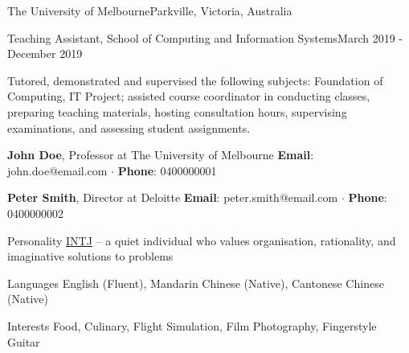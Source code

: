 \documentclass{cv}
\begin{document}
\begin{cvlist}
\begin{cvheading}{The University of Melbourne}{Parkville, Victoria, Australia}
\begin{cvsubheading}{Teaching Assistant, School of Computing and Information Systems}{March 2019 - December 2019}
    \item Tutored, demonstrated and supervised the following subjects: Foundation of Computing, IT Project; assisted course coordinator in conducting classes, preparing teaching materials, hosting consultation hours, supervising examinations, and assessing student assignments.
\end{cvsubheading}
\end{cvheading}

\end{cvlist}

\pagebreak

\begin{cvlist}

\item \textbf{John Doe}, Professor at The University of Melbourne \newline
\textbf{Email}: john.doe@email.com $\cdot$ \textbf{Phone}: 0400000001

\item \textbf{Peter Smith}, Director at Deloitte \newline
\textbf{Email}: peter.smith@email.com $\cdot$ \textbf{Phone}: 0400000002

\end{cvlist}

\begin{cvlist}[-2.0pt]

\begin{cvlistitem}{Personality}
\href{https://www.16personalities.com/intj-personality}{INTJ} -- a quiet individual who values organisation, rationality, and imaginative solutions to problems
\end{cvlistitem}

\begin{cvlistitem}{Languages}
English (Fluent), Mandarin Chinese (Native), Cantonese Chinese (Native)
\end{cvlistitem}

\begin{cvlistitem}{Interests}
Food, Culinary, Flight Simulation, Film Photography, Fingerstyle Guitar
\end{cvlistitem}

\end{cvlist}
\end{document}

